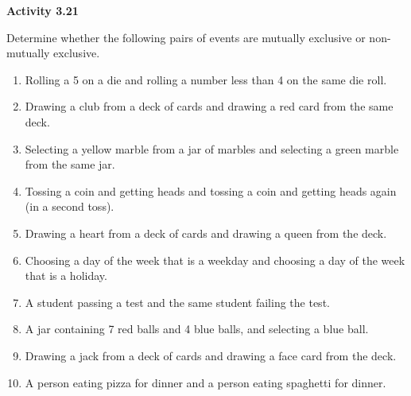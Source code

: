 \vspace{0.3ex}
\noindent\textbf{Activity 3.21}

\vspace{0.2ex}

Determine whether the following pairs of events are mutually exclusive or non-mutually exclusive.

\begin{enumerate}[label=\color{blue}\arabic*.]
    \item Rolling a 5 on a die and rolling a number less than 4 on the same die roll.
    \item Drawing a club from a deck of cards and drawing a red card from the same deck.
    \item Selecting a yellow marble from a jar of marbles and selecting a green marble from the same jar.
    \item Tossing a coin and getting heads and tossing a coin and getting heads again (in a second toss).
    \item Drawing a heart from a deck of cards and drawing a queen from the deck.
    \item Choosing a day of the week that is a weekday and choosing a day of the week that is a holiday.
    \item A student passing a test and the same student failing the test.
    \item A jar containing 7 red balls and 4 blue balls, and selecting a blue ball.
    \item Drawing a jack from a deck of cards and drawing a face card from the deck.
    \item A person eating pizza for dinner and a person eating spaghetti for dinner.

\end{enumerate}
